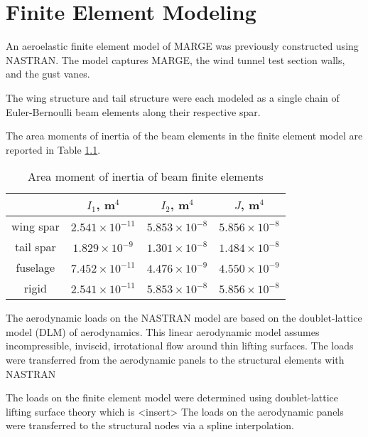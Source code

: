 \chapter{Finite Element Modeling}
\label{ch:nastran}

An aeroelastic finite element model of MARGE was previously constructed using NASTRAN. The model captures MARGE, the wind tunnel test section walls, and the gust vanes.


The wing structure and tail structure were each modeled as a single chain of Euler-Bernoulli beam elements along their respective spar.

The area moments of inertia of the beam elements in the finite element model are reported in Table \ref{tab:beamInertia}.
\begin{table}[H]
    \centering
    \caption{Area moment of inertia of beam finite elements}
    \begin{tabular}{cccc}
        \hline\hline
                  & $I_1$, m$^4$          & $I_2$, m$^4$         & $J$, m$^4$           \\
        \hline
        wing spar & $2.541\times10^{-11}$ & $5.853\times10^{-8}$ & $5.856\times10^{-8}$ \\
        tail spar & $1.829\times10^{-9}$  & $1.301\times10^{-8}$ & $1.484\times10^{-8}$ \\
        fuselage  & $7.452\times10^{-11}$ & $4.476\times10^{-9}$ & $4.550\times10^{-9}$ \\
        rigid     & $2.541\times10^{-11}$ & $5.853\times10^{-8}$ & $5.856\times10^{-8}$ \\
        \hline\hline
    \end{tabular}
    \label{tab:beamInertia}
\end{table}

The aerodynamic loads on the NASTRAN model are based on the doublet-lattice model (DLM) of aerodynamics. This linear aerodynamic model assumes incompressible, inviscid, irrotational flow around thin lifting surfaces. The loads were transferred from the aerodynamic panels to the structural elements with NASTRAN

The loads on the finite element model were determined using doublet-lattice lifting surface theory which is <insert>
The loads on the aerodynamic panels were transferred to the structural nodes via a spline interpolation.

